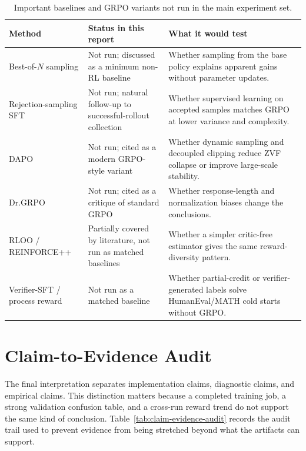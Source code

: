 \documentclass[12pt,a4paper]{report}
\begin{document}
\begin{table}[ht]
\centering
\caption{Important baselines and GRPO variants not run in the main experiment set.}
\label{tab:missing-modern-baselines}
\small
\footnotesize
\begin{tabularx}{\textwidth}{p{3.0cm}p{3.6cm}X}
\toprule
Method & Status in this report & What it would test\\
\midrule
Best-of-$N$ sampling & Not run; discussed as a minimum non-RL baseline & Whether sampling from the base policy explains apparent gains without parameter updates.\\
Rejection-sampling SFT & Not run; natural follow-up to successful-rollout collection & Whether supervised learning on accepted samples matches GRPO at lower variance and complexity.\\
DAPO & Not run; cited as a modern GRPO-style variant~\citep{yu2025dapo} & Whether dynamic sampling and decoupled clipping reduce ZVF collapse or improve large-scale stability.\\
Dr.GRPO & Not run; cited as a critique of standard GRPO~\citep{liu2025understanding} & Whether response-length and normalization biases change the conclusions.\\
RLOO / REINFORCE++ & Partially covered by literature, not run as matched baselines~\citep{ahmadian2024backtobasics,hu2025reinforceplusplus} & Whether a simpler critic-free estimator gives the same reward-diversity pattern.\\
Verifier-SFT / process reward & Not run as a matched baseline & Whether partial-credit or verifier-generated labels solve HumanEval/MATH cold starts without GRPO.\\
\bottomrule
\end{tabularx}
\end{table}

\section{Claim-to-Evidence Audit}
\label{sec:claim-evidence-audit}

The final interpretation separates implementation claims, diagnostic claims, and empirical claims. This distinction matters because a completed training job, a strong validation confusion table, and a cross-run reward trend do not support the same kind of conclusion. Table~\ref{tab:claim-evidence-audit} records the audit trail used to prevent evidence from being stretched beyond what the artifacts can support.
\end{document}
